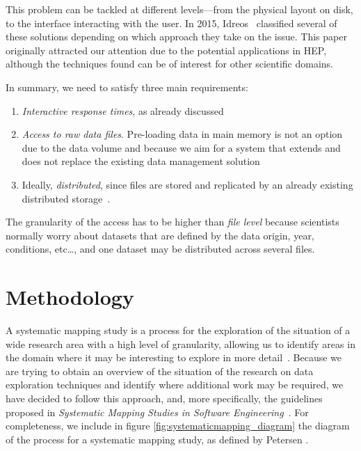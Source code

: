 This problem can be tackled at different levels---from the physical layout on disk,
to the interface interacting with the user. In 2015, Idreos~\cite{Idreos2015}
classified several of these solutions depending on which approach they take
on the issue. This paper originally attracted our attention  due to the potential
applications in \gls{HEP}\footnotemark, although
the techniques found can be of interest for other scientific domains.


In summary, we need to satisfy three main requirements:

\begin{enumerate}
  \item \emph{Interactive response times}, as already discussed
  \item \emph{Access to raw data files}. Pre-loading data in main memory is not an
    option due to the data volume and because we aim for a system that extends and does
    not replace the existing data management solution
  \item Ideally, \emph{distributed}, since files are stored and replicated by an already existing
    distributed storage~\cite{Baud2012}.
\end{enumerate}

The granularity of the access has to be higher than \emph{file level} because
scientists normally worry about datasets that are defined by the data origin,
year, conditions, etc\ldots, and one dataset may be distributed across
several files.

\vfill

\section{Methodology}
\label{sec:mapping/methodology}

A systematic mapping study is a process for the exploration of the
situation of a wide research area with a high level of granularity,
allowing us to identify areas in the domain where it may be interesting to
explore in more detail~\cite{Kitchenham2007}. Because we are trying to obtain
an overview of the situation of the research on data exploration techniques
and identify where additional work may be required, we have decided to follow this
approach, and, more specifically, the guidelines proposed in
\emph{Systematic Mapping Studies in Software Engineering}~\cite{Petersen2007}.
For completeness, we include in figure \ref{fig:systematicmapping_diagram} the
diagram of the process for a systematic mapping study, as defined by
Petersen \etal.

